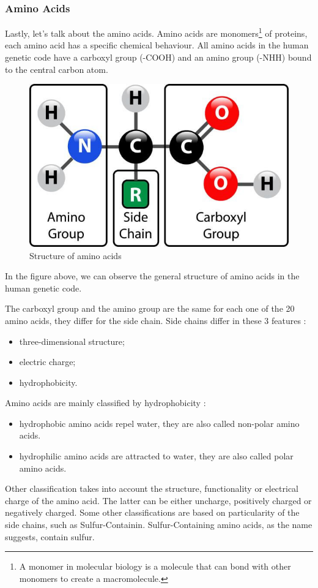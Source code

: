 \subsubsection{Amino Acids}
Lastly, let's talk about the amino acids.
Amino acids are monomers\footnote{A monomer in molecular biology is a molecule that can bond with other monomers to create a macromolecule. } of proteins, each amino acid has a specific chemical behaviour.
All amino acids in the human genetic code have a carboxyl group (-COOH) and an amino group (-NHH) bound to the central carbon atom. 

\vspace{2em}

\begin{figure}[h!]
	\includegraphics[scale=0.6]{res/proteins_overview/amino_structure.png}
	\centering
	\caption{Structure of amino acids}
\end{figure}

In the figure above, we can observe the general structure of amino acids in the human genetic code.

The carboxyl group and the amino group are the same for each one of the 20 amino acids, they differ for the side chain. Side chains differ in these 3 features :
\begin{itemize}
	\item three-dimensional structure;
	\item electric charge;
	\item hydrophobicity.
\end{itemize}

Amino acids are mainly classified by hydrophobicity :
\begin{itemize}
	\item hydrophobic amino acids repel water, they are also called non-polar amino acids. 
	\item hydrophilic amino acids are attracted to water, they are also called polar amino acids.
\end{itemize}
\pagebreak
Other classification takes into account the structure, functionality or electrical charge of the amino acid. The latter can be either uncharge, positively charged or negatively charged.
Some other classifications are based on particularity of the side chains, such as Sulfur-Containin. Sulfur-Containing amino acids, as the name suggests, contain sulfur. 

